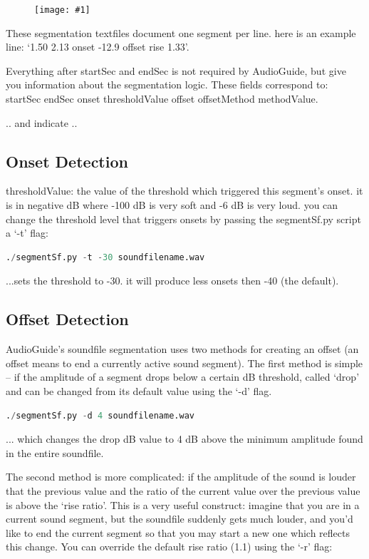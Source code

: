 \documentclass{article}
\newcommand{\figurewrap}[2]{\begin{figure}[h!]
\centering
\texttt{[image: \#1]}
\end{figure}}
\begin{document}
\begin{spacing}{1.2}
\figurewrap{image1.png}{1}

These segmentation textfiles document one segment per line. here is an example line: `1.50 2.13 onset -12.9 offset rise 1.33'.

Everything after startSec and endSec is not required by AudioGuide, but give you information about the segmentation logic.  These fields correspond to: startSec endSec onset thresholdValue offset offsetMethod methodValue.

.. and indicate ..

\subsection{Onset Detection}
thresholdValue: the value of the threshold which triggered this segment's onset. it is in negative dB where -100 dB is very soft and -6 dB is very loud. you can change the threshold level that triggers onsets by passing the segmentSf.py script a `-t' flag:
\begin{lstlisting}[language=python]
./segmentSf.py -t -30 soundfilename.wav
\end{lstlisting}
...sets the threshold to -30. it will produce less onsets then -40 (the default).

\subsection{Offset Detection}
AudioGuide's soundfile segmentation uses two methods for creating an offset (an offset means to end a currently active sound segment).  
The first method is simple -- if the amplitude of a segment drops below a certain dB threshold, called `drop' and can be changed from its default value using the `-d' flag.

\begin{lstlisting}[language=python]
./segmentSf.py -d 4 soundfilename.wav
\end{lstlisting}

... which changes the drop dB value to 4 dB above the minimum amplitude found in the entire soundfile.

The second method is more complicated: if the amplitude of the sound is louder that the previous value and the ratio of the current value over the previous value is above the `rise ratio'.  This is a very useful construct: imagine that you are in a current sound segment, but the soundfile suddenly gets much louder, and you'd like to end the current segment so that you may start a new one which reflects this change.  You can override the default rise ratio (1.1) using the `-r' flag:


\end{spacing}
\end{document}
